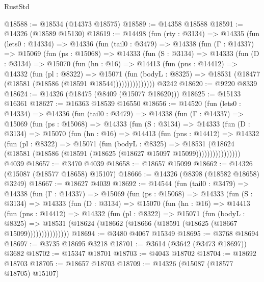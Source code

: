 \begin{lexlean}{RustStd}
\begin{coremodule}
@18588 := @18534 (@14373 @18575)
@18589 := @14358 @18588
@18591 := @14326 (@18589 @15130)
@18619 := @14498
    (fun (rty : @3134) =>
    @14335
      (fun (lets0 : @14334) =>
      @14336
        (fun (tail0 : @3479) =>
        @14338
          (fun (Γ : @14337) =>
          @15069
            (fun (ps : @15068) =>
            @14333
              (fun (S : @3134) =>
              @14333
                (fun (D : @3134) =>
                @15070
                  (fun (hn : @16) =>
                  @14413
                    (fun (pns : @14412) =>
                    @14332
                      (fun (pl : @8322) =>
                      @15071
                        (fun (bodyL : @8325) =>
                        @18531 (@18477 (@18581 (@18586 (@18591 @18544)))))))))))))))
    @3242
@18620 := @9220 @8339
@18624 := @14326 (@18475 (@8409 (@15077 @18620)))
@18625 := @15133 @16361
@18627 := @16363 @18539 @16550
@18656 := @14520
    (fun (lets0 : @14334) =>
    @14336
      (fun (tail0 : @3479) =>
      @14338
        (fun (Γ : @14337) =>
        @15069
          (fun (ps : @15068) =>
          @14333
            (fun (S : @3134) =>
            @14333
              (fun (D : @3134) =>
              @15070
                (fun (hn : @16) =>
                @14413
                  (fun (pns : @14412) =>
                  @14332
                    (fun (pl : @8322) =>
                    @15071
                      (fun (bodyL : @8325) =>
                      @18531
                        (@18624
                          (@18581 (@18586 (@18591 (@18625 (@18627 @15097 @15099))))))))))))))))
    @4039
@18657 := @3470 @4039
@18658 := @18657 @15099
@18662 := @14326 (@15087 (@18577 @18658) @15107)
@18666 := @14326 (@8398 (@18582 @18658) @3249)
@18667 := @18627 @4039
@18692 := @14544
    (fun (tail0 : @3479) =>
    @14338
      (fun (Γ : @14337) =>
      @15069
        (fun (ps : @15068) =>
        @14333
          (fun (S : @3134) =>
          @14333
            (fun (D : @3134) =>
            @15070
              (fun (hn : @16) =>
              @14413
                (fun (pns : @14412) =>
                @14332
                  (fun (pl : @8322) =>
                  @15071
                    (fun (bodyL : @8325) =>
                    @18531 (@18624 (@18662 (@18666 (@18591 (@18625 (@18667 @15099)))))))))))))))
@18694 := @3480 @4067 @15349
@18695 := @3768 @18694
@18697 := @3735 @18695 @3218
@18701 := @3614 (@3642 (@3473 @18697)) @3682
@18702 := @15347 @18701
@18703 := @4043 @18702
@18704 := @18692 @18703
@18705 := @18657 @18703
@18709 := @14326 (@15087 (@18577 @18705) @15107)

\end{coremodule}
\end{lexlean}
